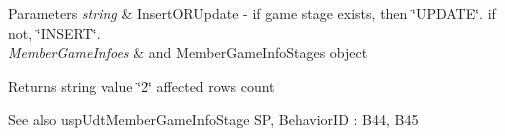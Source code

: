 \begin{DoxyParams}{Parameters}
{\em string} & Insert\+O\+R\+Update -\/ if game stage exists, then \char`\"{}\+U\+P\+D\+A\+T\+E\char`\"{}. if not, \char`\"{}\+I\+N\+S\+E\+R\+T\char`\"{}. \\
\hline
{\em Member\+Game\+Infoes} & and Member\+Game\+Info\+Stages object \\
\hline
\end{DoxyParams}
\begin{DoxyReturn}{Returns}
string value \char`\"{}2\char`\"{} affected rows count 
\end{DoxyReturn}
\begin{DoxySeeAlso}{See also}
usp\+Udt\+Member\+Game\+Info\+Stage SP, Behavior\+ID \+: B44, B45 
\end{DoxySeeAlso}
